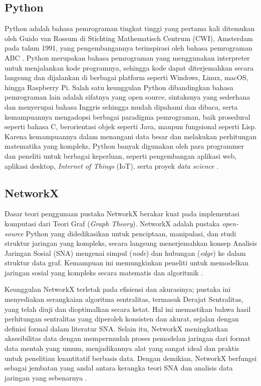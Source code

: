 \subsection{Python}
Python adalah bahasa pemrograman tingkat tinggi yang pertama kali ditemukan oleh Guido van Rossum di Stichting Mathematisch Centrum (CWI), Amsterdam pada tahun 1991, yang pengembangannya terinspirasi oleh bahasa pemrograman ABC \cite{Rahman2023}.
Python merupakan bahasa pemrograman yang menggunakan interpreter untuk menjalankan kode programnya, sehingga kode dapat diterjemahkan secara langsung dan dijalankan di berbagai platform seperti Windows, Linux, macOS, hingga Raspberry Pi. 
Salah satu keunggulan Python dibandingkan bahasa pemrograman lain adalah sifatnya yang open source, sintaksnya yang sederhana dan menyerupai bahasa Inggris sehingga mudah dipahami dan dibaca, serta kemampuannya mengadopsi berbagai paradigma pemrograman, baik prosedural seperti bahasa C, berorientasi objek seperti Java, maupun fungsional seperti Lisp. Karena kemampuannya dalam menangani data besar dan melakukan perhitungan matematika yang kompleks, Python banyak digunakan oleh para programmer dan peneliti untuk berbagai keperluan, seperti pengembangan aplikasi web, aplikasi desktop, \textit{Internet of Things} (IoT), serta proyek \textit{data science} \cite{Rahman2023}.

\subsection{NetworkX}
Dasar teori penggunaan pustaka NetworkX berakar kuat pada implementasi komputasi dari Teori Graf (\textit{Graph Theory}). NetworkX adalah pustaka \textit{open-source} Python yang didedikasikan untuk penciptaan, manipulasi, dan studi struktur jaringan yang kompleks, secara langsung menerjemahkan konsep Analisis Jaringan Sosial (SNA) mengenai simpul (\textit{node}) dan hubungan (\textit{edge}) ke dalam struktur data graf. Kemampuan ini memungkinkan peneliti untuk memodelkan jaringan sosial yang kompleks secara matematis dan algoritmik \cite{PrimFloydSDN2022}.

Keunggulan NetworkX terletak pada efisiensi dan akurasinya; pustaka ini menyediakan serangkaian algoritma sentralitas, termasuk Derajat Sentralitas, yang telah diuji dan dioptimalkan secara ketat. Hal ini memastikan bahwa hasil perhitungan sentralitas yang diperoleh konsisten dan akurat, sejalan dengan definisi formal dalam literatur SNA. Selain itu, NetworkX meningkatkan aksesibilitas data dengan mempermudah proses pemodelan jaringan dari format data mentah yang umum, menjadikannya alat yang sangat ideal dan praktis untuk penelitian kuantitatif berbasis data. Dengan demikian, NetworkX berfungsi sebagai jembatan yang andal antara kerangka teori SNA dan analisis data jaringan yang sebenarnya \cite{PrimFloydSDN2022}.

